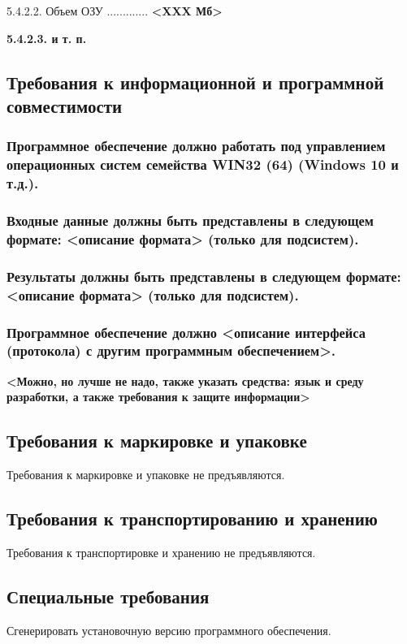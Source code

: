 \documentclass[utf8x, 12pt, oneside, a4paper]{article}
\begin{document}
	5.4.2.2. Объем ОЗУ ............. \textbf{<XXX Мб>}

	\textbf{5.4.2.3. и т. п.}

	\subsection{Требования к информационной и программной совместимости}

	\subsubsection{Программное обеспечение должно работать под управлением операционных систем семейства \textbf{WIN32 (64) (Windows 10 и т.д.)}.}

	\subsubsection{\textbf{Входные данные должны быть представлены в следующем формате: <описание формата> (только для подсистем).}}

	\subsubsection{\textbf{Результаты должны быть представлены в следующем формате: <описание формата> (только для подсистем).}}
	
	\subsubsection{\textbf{Программное обеспечение должно <описание интерфейса (протокола) с другим программным обеспечением>.}}
	\textbf{<Можно, но лучше не надо, также указать средства: язык и среду разработки, а также требования к защите информации>}

	\subsection{Требования к маркировке и упаковке}
	Требования к маркировке и упаковке не предъявляются.
	
	\subsection{Требования к транспортированию и хранению}
	Требования к транспортировке и хранению не предъявляются.
	
	\subsection{Специальные требования}
	Сгенерировать установочную версию программного обеспечения.
\end{document}
